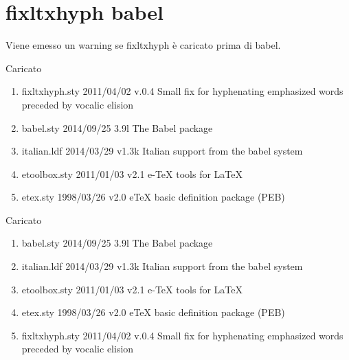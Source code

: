 \section{fixltxhyph babel}
Viene emesso un warning se fixltxhyph è caricato prima di babel. 

Caricato 
\begin{enumerate}
\item fixltxhyph.sty 2011/04/02 v.0.4 Small fix for hyphenating emphasized words preceded by vocalic elision
\item babel.sty 2014/09/25 3.9l The Babel package
\item italian.ldf 2014/03/29 v1.3k Italian support from the babel system
\item etoolbox.sty 2011/01/03 v2.1 e-TeX tools for LaTeX
\item etex.sty 1998/03/26 v2.0 eTeX basic definition package (PEB)
\end{enumerate}

Caricato 
\begin{enumerate}
\item babel.sty 2014/09/25 3.9l The Babel package
\item italian.ldf 2014/03/29 v1.3k Italian support from the babel system
\item etoolbox.sty 2011/01/03 v2.1 e-TeX tools for LaTeX
\item etex.sty 1998/03/26 v2.0 eTeX basic definition package (PEB)
\item fixltxhyph.sty 2011/04/02 v.0.4 Small fix for hyphenating emphasized words preceded by vocalic elision
\end{enumerate}

